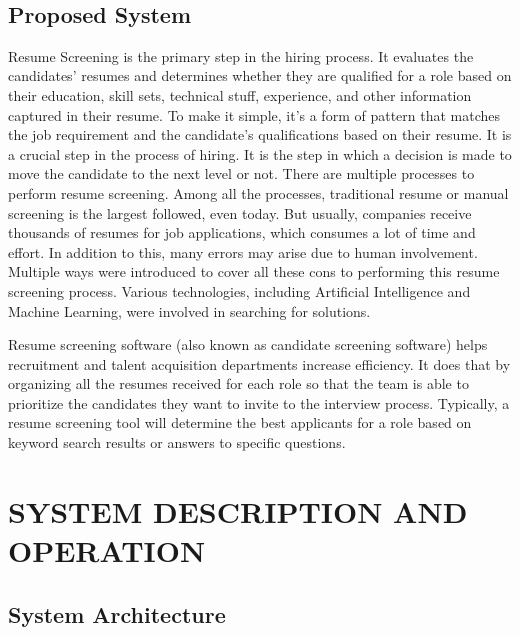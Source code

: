 \documentclass[12 pt, oneside]{book}
\begin{document}
 \\


\section{Proposed System}
Resume Screening is the primary step in the hiring process. It evaluates the candidates' resumes and determines whether they are qualified for a role based on their education, skill sets, technical stuff, experience, and other information captured in their resume. To make it simple, it's a form of pattern that matches the job requirement and the candidate's qualifications based on their resume. It is a crucial step in the process of hiring. It is the step in which a decision is made to move the candidate to the next level or not. There are multiple processes to perform resume screening. Among all the processes, traditional resume or manual screening is the largest followed, even today. But usually, companies receive thousands of resumes for job applications, which consumes a lot of time and effort. In addition to this, many errors may arise due to human involvement. Multiple ways were introduced to cover all these cons to performing this resume screening process. Various technologies, including Artificial Intelligence and Machine Learning, were involved in searching for solutions.
\newline
\par Resume screening software (also known as candidate screening software) helps recruitment and talent acquisition departments increase efficiency. It does that by organizing all the resumes received for each role so that the team is able to prioritize the candidates they want to invite to the interview process. Typically, a resume screening tool will determine the best applicants for a role based on keyword search results or answers to specific questions.

\chapter{SYSTEM DESCRIPTION AND OPERATION}  %



\section{System Architecture}
\end{document}
